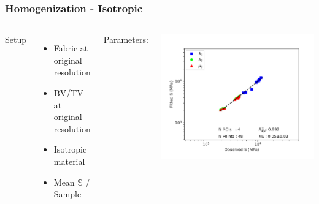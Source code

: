 \documentclass[xcolor=table,11pt]{beamer}
\begin{document}
	\begin{frame}
		\frametitle{Homogenization - Isotropic}

		\begin{columns}
			Setup
			\begin{itemize}
				\item Fabric at original resolution
				\item BV/TV at original resolution
				\item Isotropic material
				\item Mean $\mathbb{S}$ / Sample
			\end{itemize}
			\vspace{5mm}
			Parameters:

			\vfill
			\includegraphics[width=\linewidth, trim=75 0 0 0]{05_Homogenization/Plots/FabricElasticity_Iso}\\
			\vfill

		\end{columns}
	\end{frame}
\end{document}
